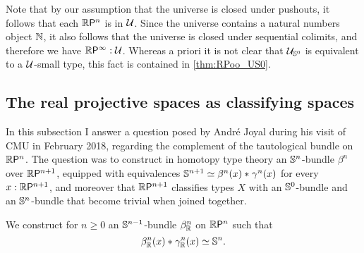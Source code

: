 \begin{rmk}
Note that by our assumption that the universe is closed under pushouts, it
follows that each $\rprojective{n}$ is in $\UU$. 
Since the universe contains a natural numbers object $\N$, 
it also follows that the universe is closed under sequential colimits,
and therefore we have $\rprojective{\infty}:\UU$. 
Whereas a priori it is not clear that $\UU_{\sphere{0}}$ is equivalent to a 
$\UU$-small type, this fact is contained in \cref{thm:RPoo_US0}.
\end{rmk}

\subsection{The real projective spaces as classifying spaces}
In this subsection I answer a question posed by André Joyal during his visit of CMU in February 2018, regarding the complement of the tautological bundle on $\rprojective{n}$. The question was to construct in homotopy type theory an $\sphere{n}$-bundle $\beta^n$ over $\rprojective{n+1}$, equipped with equivalences $\eqv{\sphere{n+1}}{\join{\beta^n(x)}{\gamma^n(x)}}$ for every $x:\rprojective{n+1}$, and moreover that $\rprojective{n+1}$ classifies types $X$ with an $\sphere{0}$-bundle and an $\sphere{n}$-bundle that become trivial when joined together. 

\begin{defn}
We construct for $n\geq 0$ an $\sphere{n-1}$-bundle $\orthcomp[\R]{n}$ on $\rprojective{n}$ such that
\begin{equation*}
\eqv{\join{\orthcomp[\R]{n}(x)}{\tautfam[\R]{n}(x)}}{\sphere{n}}.
\end{equation*}
\end{defn}

